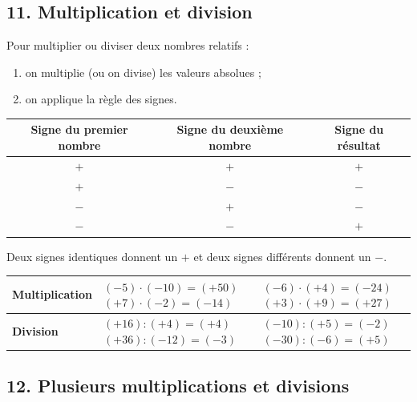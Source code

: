 \newpage
\subsection*{11. Multiplication et division}

Pour multiplier ou diviser deux nombres relatifs :
\begin{enumerate}[leftmargin=*, itemsep=2pt, topsep=2pt]
    \item on multiplie (ou on divise) les \textcolor{themeNO}{valeurs absolues} ;
    \item on applique la \textcolor{themeNO}{règle des signes}.
\end{enumerate}

\begin{center}
\def\arraystretch{1.4}
\begin{tabular}{|c|c|c|}
\hline
\textbf{Signe du premier nombre} & \textbf{Signe du deuxième nombre} & \textbf{Signe du résultat}\\\hline
$+$ & $+$ & $+$\\\hline
$+$ & $-$ & $-$\\\hline
$-$ & $+$ & $-$\\\hline
$-$ & $-$ & $+$\\\hline
\end{tabular}
\def\arraystretch{1}
\end{center}

Deux signes \textcolor{themeNO}{identiques} donnent un $+$ et deux signes \textcolor{themeNO}{différents} donnent un $-$.

\vspace{20pt}
\def\arraystretch{1.6}
\begin{tabularx}{\linewidth}{|>{\raggedright\arraybackslash}p{3cm}|>{\centering\arraybackslash}X|>{\centering\arraybackslash}X|}
\hline
\textbf{Multiplication} & $(-5)\cdot(-10)=(+50)$\newline $(+7)\cdot(-2)=(-14)$ & $(-6)\cdot(+4)=(-24)$\newline $(+3)\cdot(+9)=(+27)$\\\hline
\textbf{Division} & $(+16):(+4)=(+4)$\newline $(+36):(-12)=(-3)$ & $(-10):(+5)=(-2)$\newline $(-30):(-6)=(+5)$\\\hline
\end{tabularx}
\def\arraystretch{1}

\vfill
\subsection*{12. Plusieurs multiplications et divisions}


